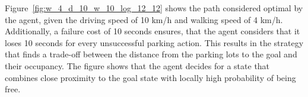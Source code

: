 Figure~\ref{fig:w_4_d_10_w_10_log_12_12} shows the path considered optimal by
the agent, given the driving speed of 10 km/h and walking speed of 4 km/h.
Additionally, a failure cost of 10 seconds ensures, that the agent considers
that it loses 10 seconds for every unsuccessful parking action. This results
in the strategy that finds a trade-off between the distance from the parking
lots to the goal and their occupancy. The figure shows that the agent decides
for a state that combines close proximity to the goal state with locally high
probability of being free.

\begin{figure}[t]
\begin{center}
\hspace{6mm}
\end{center}
\caption{}
\label{fig:long_wait_fast_walk}
\end{figure}

